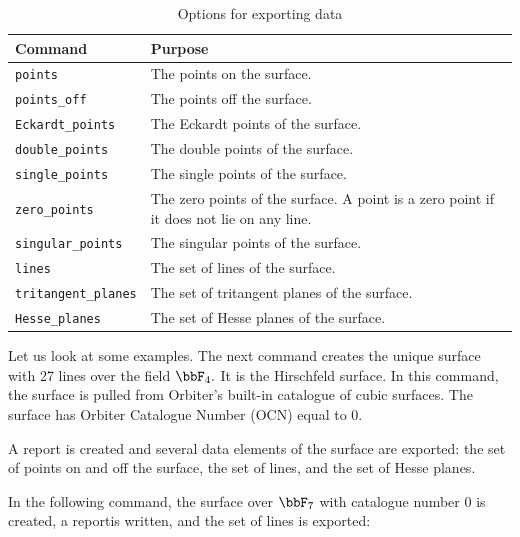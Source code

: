 \begin{table}
\begin{center}
\begin{tabular}{|p{4cm}|p{8cm}|}
\hline
Command  & Purpose \\
\hline
\hline
\verb'points' & The points on the surface. \\
\hline
\verb'points_off' & The points off the surface. \\
\hline
\verb'Eckardt_points' & The Eckardt points of the surface. \\
\hline
\verb'double_points' & The double points of the surface. \\
\hline
\verb'single_points' & The single points of the surface. \\
\hline
\verb'zero_points' & The zero points of the surface. A point is a zero point if it does not lie on any line.\\
\hline
\verb'singular_points' & The singular points of the surface. \\
\hline
\verb'lines' & The set of lines of the surface. \\
\hline
\verb'tritangent_planes' & The set of tritangent planes of the surface. \\
\hline
\verb'Hesse_planes' & The set of Hesse planes of the surface. \\
\hline
\end{tabular}
\end{center}
\caption{\label{tab:cubic:surface:export}Options for exporting data}
\end{table}


Let us look at some examples. 
The next command creates the unique surface with 27 lines 
over the field $\bbF_4.$ 
It is the Hirschfeld surface. 
In this command, the surface is pulled from Orbiter's built-in catalogue of cubic surfaces. 
The surface has Orbiter Catalogue Number (OCN) equal to 0.
{\tt

}
A report is created and several data elements 
of the surface are exported: the set of points on and off the surface, 
the set of lines, and the set of Hesse planes.

\bigskip


In the following command, the surface over $\bbF_7$ with catalogue number 0 is created, a reportis written, 
and the set of lines is exported:
{\tt

}

\bigskip



